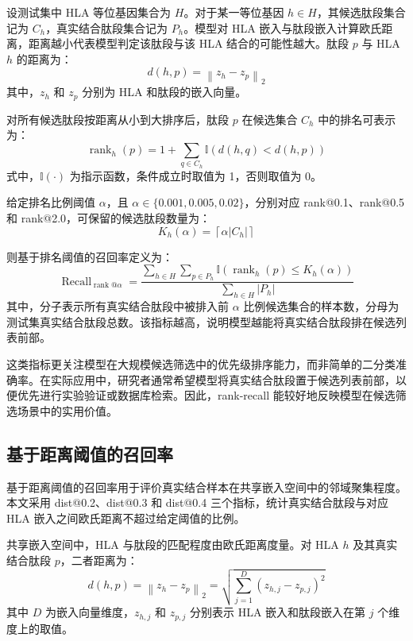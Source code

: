 设测试集中 HLA 等位基因集合为 $H$。对于某一等位基因 $h \in H$，其候选肽段集合记为 $C_h$，真实结合肽段集合记为 $P_h$。模型对 HLA 嵌入与肽段嵌入计算欧氏距离，距离越小代表模型判定该肽段与该 HLA 结合的可能性越大。肽段 $p$ 与 HLA $h$ 的距离为：
\begin{equation}
    d(h,p)=\left\|z_h-z_p\right\|_2
\end{equation}
其中，$z_h$ 和 $z_p$ 分别为 HLA 和肽段的嵌入向量。

对所有候选肽段按距离从小到大排序后，肽段 $p$ 在候选集合 $C_h$ 中的排名可表示为：
\begin{equation}
\operatorname{rank}_h(p)
=
1+
\sum_{q \in C_h}
\mathbb{I}\left(d(h,q)<d(h,p)\right)
\end{equation}
式中，$\mathbb{I}(\cdot)$ 为指示函数，条件成立时取值为 1，否则取值为 0。

给定排名比例阈值 $\alpha$，且 $\alpha \in \{0.001,0.005,0.02\}$，分别对应 rank@0.1、rank@0.5 和 rank@2.0，可保留的候选肽段数量为：
\begin{equation}
K_h(\alpha)=\left\lceil \alpha |C_h| \right\rceil
\end{equation}

则基于排名阈值的召回率定义为：
\begin{equation}
\operatorname{Recall}_{\operatorname{rank}@\alpha}
=
\frac{
\sum_{h \in H}
\sum_{p \in P_h}
\mathbb{I}\left(
\operatorname{rank}_h(p) \le K_h(\alpha)
\right)
}{
\sum_{h \in H}|P_h|
}
\end{equation}
其中，分子表示所有真实结合肽段中被排入前 $\alpha$ 比例候选集合的样本数，分母为测试集真实结合肽段总数。该指标越高，说明模型越能将真实结合肽段排在候选列表前部。

这类指标更关注模型在大规模候选筛选中的优先级排序能力，而非简单的二分类准确率。在实际应用中，研究者通常希望模型将真实结合肽段置于候选列表前部，以便优先进行实验验证或数据库检索。因此，rank-recall 能较好地反映模型在候选筛选场景中的实用价值。

\subsection{基于距离阈值的召回率}

基于距离阈值的召回率用于评价真实结合样本在共享嵌入空间中的邻域聚集程度。本文采用 dist@0.2、dist@0.3 和 dist@0.4 三个指标，统计真实结合肽段与对应 HLA 嵌入之间欧氏距离不超过给定阈值的比例。

共享嵌入空间中，HLA 与肽段的匹配程度由欧氏距离度量。对 HLA $h$ 及其真实结合肽段 $p$，二者距离为：
\[
d(h,p)
=
\left\|z_h-z_p\right\|_2
=
\sqrt{
\sum_{j=1}^{D}
\left(z_{h,j}-z_{p,j}\right)^2
}
\]
其中 $D$ 为嵌入向量维度，$z_{h,j}$ 和 $z_{p,j}$ 分别表示 HLA 嵌入和肽段嵌入在第 $j$ 个维度上的取值。

